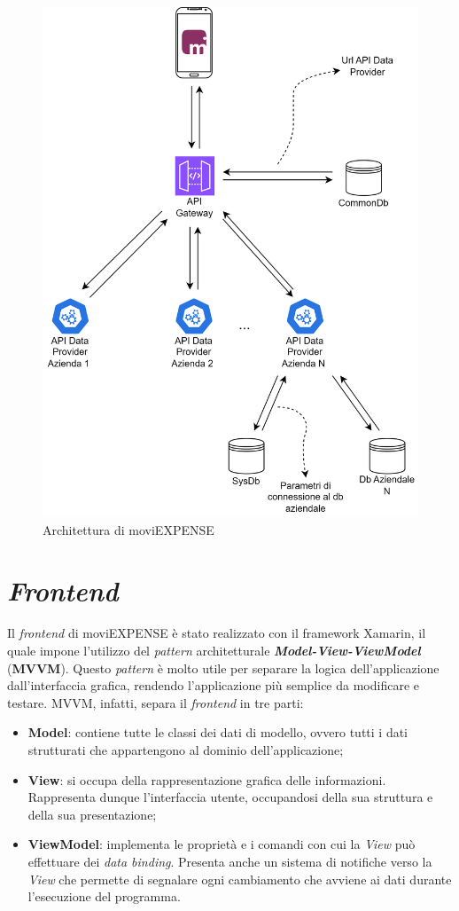 \begin{figure}[H]
    \centering 
    \includegraphics[width=.8\columnwidth]{images/architettura moviEXPENSE.png} 
    \caption{Architettura di moviEXPENSE}
    \label{fig:microservizi}
\end{figure}

\section{\textit{Frontend}}

Il \textit{frontend} di moviEXPENSE è stato realizzato con il framework Xamarin, il quale impone l'utilizzo del \textit{pattern} architetturale \textit{\textbf{Model-View-ViewModel}} (\textbf{MVVM}). Questo \textit{pattern} è molto utile per separare la logica dell'applicazione dall'interfaccia grafica, rendendo l'applicazione più semplice da modificare e testare. MVVM, infatti, separa il \textit{frontend} in tre parti:
\begin{itemize}
    \item \textbf{Model}: contiene tutte le classi dei dati di modello, ovvero tutti i dati strutturati che appartengono al dominio dell'applicazione;
    \item \textbf{View}: si occupa della rappresentazione grafica delle informazioni. Rappresenta dunque l'interfaccia utente, occupandosi della sua struttura e della sua presentazione;
    \item \textbf{ViewModel}: implementa le proprietà e i comandi con cui la \textit{View} può effettuare dei \textit{data binding}. Presenta anche un sistema di notifiche verso la \textit{View} che permette di segnalare ogni cambiamento che avviene ai dati durante l'esecuzione del programma.
\end{itemize}

